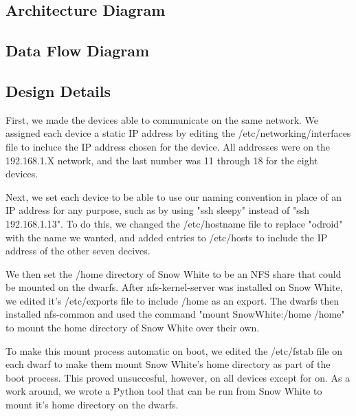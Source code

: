 \subsection{ Architecture  Diagram}


\subsection{Data Flow Diagram}


\subsection{Design Details}
First, we made the devices able to communicate on the same network. We assigned each device a static IP address by editing the /etc/networking/interfaces file to incluce the IP address chosen for the device. All addresses were on the 192.168.1.X network, and the last number was 11 through 18 for the eight devices.

Next, we set each device to be able to use our naming convention in place of an IP address for any purpose, such as by using "ssh sleepy" instead of "ssh 192.168.1.13". To do this, we changed the /etc/hostname file to replace "odroid" with the name we wanted, and added entries to /etc/hosts to include the IP address of the other seven decives. 

We then set the /home directory of Snow White to be an NFS share that could be mounted on the dwarfs. After nfs-kernel-server was installed on Snow White, we edited it's /etc/exports file to include /home as an export. The dwarfs then installed nfs-common and used the command "mount SnowWhite:/home /home" to mount the home directory of Snow White over their own.

To make this mount process automatic on boot, we edited the /etc/fstab file on each dwarf to make them mount Snow White's home directory as part of the boot process. This proved unsuccesful, however, on all devices except for on. As a work around, we wrote a Python tool that can be run from Snow White to mount it's home directory on the dwarfs.

